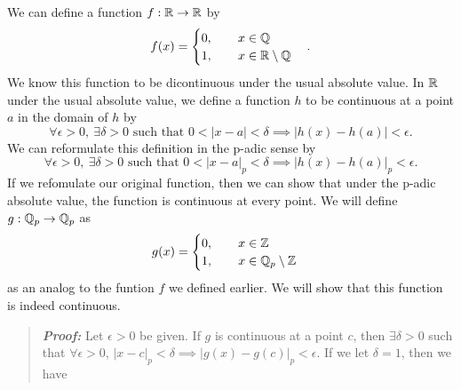 \documentclass{hw}
\begin{document}
    \noindent We can define a function $f:\mathbb{R}\to\mathbb{R}$ by
    \[
        f(x)=
        \begin{cases}
            0, \qquad x\in\mathbb{Q}\\
            1, \qquad x\in\mathbb{R}\setminus\mathbb{Q}
        \end{cases}.
    \]
    We know this function to be dicontinuous under the usual absolute value. In $\mathbb{R}$ under the usual absolute value,
    we define a function $h$ to be continuous at a point $a$ in the domain of $h$ by
    \[
        \forall\epsilon > 0,\ \exists\delta > 0 \text{ such that } 0<|x-a|<\delta\implies|h(x)-h(a)|<\epsilon.
    \]
    We can reformulate this definition in the p-adic sense by
    \[
        \forall\epsilon > 0,\ \exists\delta > 0 \text{ such that } 0<|x-a|_{p}<\delta\implies|h(x)-h(a)|_{p}<\epsilon.
    \]
    If we refomulate our original function, then we can show that under the p-adic absolute value, the function is
    continuous at every point. We will define $g:\mathbb{Q}_{p}\to\mathbb{Q}_{p}$ as
    \[
        g(x)=
        \begin{cases}
            0, \qquad x\in\mathbb{Z}\\
            1, \qquad x\in\mathbb{Q}_{p}\setminus\mathbb{Z}
        \end{cases}
    \]
    as an analog to the funtion $f$ we defined earlier. We will show that this function is indeed continuous.

    \begin{quote}
        \textit{\textbf{Proof:}} Let $\epsilon>0$ be given. If $g$ is continuous at a point $c$, then $\exists\delta>0$
        such that $\forall\epsilon >0$, $|x-c|_{p}<\delta\implies|g(x)-g(c)|_{p}<\epsilon$. If we let $\delta=1$, then we have 

    \end{quote}
\end{document}
